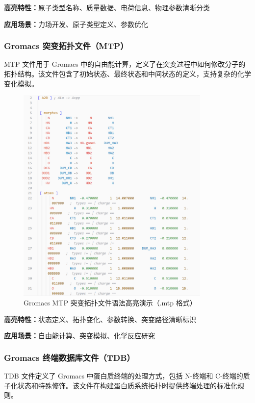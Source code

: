 \textbf{高亮特性：}原子类型名称、质量数据、电荷信息、物理参数清晰分类

\textbf{应用场景：}力场开发、原子类型定义、参数优化

\subsubsection{Gromacs 突变拓扑文件（MTP）}

MTP 文件用于 Gromacs 中的自由能计算，定义了在突变过程中如何修改分子的拓扑结构。该文件包含了初始状态、最终状态和中间状态的定义，支持复杂的化学变化模拟。

\begin{figure}[!h]
    \centering
    \includegraphics[width=0.85\textwidth]{../images/mtp.png}
    \caption{Gromacs MTP 突变拓扑文件语法高亮演示（.mtp 格式）}
    \label{fig:mtp-highlighting}
\end{figure}

\textbf{高亮特性：}状态定义、拓扑变化、参数转换、突变路径清晰标识

\textbf{应用场景：}自由能计算、突变模拟、化学反应研究

\subsubsection{Gromacs 终端数据库文件（TDB）}

TDB 文件定义了 Gromacs 中蛋白质终端的处理方式，包括 N-终端和 C-终端的质子化状态和特殊修饰。该文件在构建蛋白质系统拓扑时提供终端处理的标准化规则。

